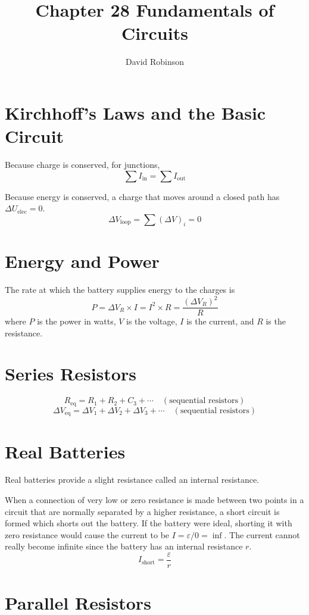 \documentclass{article}
\title{Chapter 28 Fundamentals of Circuits}
\author{David Robinson}
\date{}
\begin{document}
\maketitle

\section*{Kirchhoff's Laws and the Basic Circuit}
Because charge is conserved, for junctions,
\[\sum I_\text{in}=\sum I_\text{out}\]

Because energy is conserved, a charge that moves around a closed path has $\Delta U_\text{elec}=0$.
\[\Delta V_\text{loop}=\sum {(\Delta V)}_i=0\]

\section*{Energy and Power}
The rate at which the battery supplies energy to the charges is
\[P=\Delta V_R\times I=I^2 \times R=\frac{{(\Delta V_R)}^2}{R}\] where $P$ is the power in watts, $V$ is the voltage, $I$ is the current, and $R$ is the resistance.

\section*{Series Resistors}

\[R_\text{eq}=R_1 + R_2 + C_3 + \cdots\quad (\text{sequential resistors})\]
\[\Delta V_\text{eq}=\Delta V_1 + \Delta V_2 + \Delta V_3 + \cdots\quad (\text{sequential resistors})\]

\section*{Real Batteries}
Real batteries provide a slight resistance called an internal resistance.

\vspace{1em}

When a connection of very low or zero resistance is made between two points in a circuit that are normally separated by a higher resistance, a short circuit is formed which shorts out the battery. If the battery were ideal, shorting it with zero resistance would cause the current to be $I=\varepsilon / 0=\inf$. The current cannot really become infinite since the battery has an internal resistance $r$.
\[I_\text{short}=\frac{\varepsilon}{r}\]

\section*{Parallel Resistors}
\end{document}

